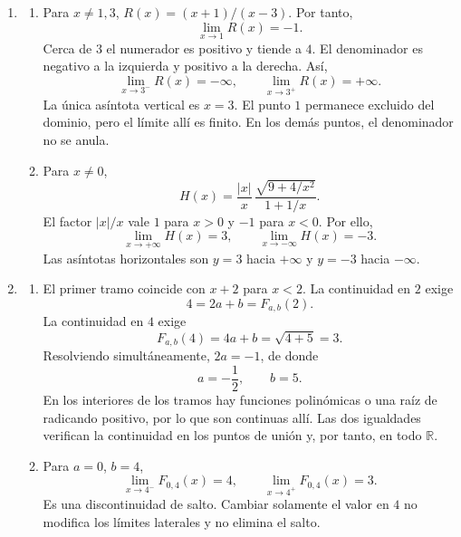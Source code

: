 \documentclass[10pt,a5paper]{article}
\newif\ifmostrarSoluciones
\begin{document}
\ifmostrarSoluciones
\newpage
\begin{solucion}[de la versión 1]
\begin{enumerate}
  \item
  \begin{enumerate}
    \item Para $x\neq1,3$, $R(x)=(x+1)/(x-3)$. Por tanto,
    \[
      \lim_{x\to1}R(x)=-1.
    \]
    Cerca de $3$ el numerador es positivo y tiende a $4$. El denominador es negativo a la izquierda y positivo a la derecha. Así,
    \[
      \lim_{x\to3^-}R(x)=-\infty,\qquad
      \lim_{x\to3^+}R(x)=+\infty.
    \]
    La única asíntota vertical es $x=3$. El punto $1$ permanece excluido del dominio, pero el límite allí es finito. En los demás puntos, el denominador no se anula.
    \item Para $x\neq0$,
    \[
      H(x)=\frac{|x|}{x}\,
      \frac{\sqrt{9+4/x^2}}{1+1/x}.
    \]
    El factor $|x|/x$ vale $1$ para $x>0$ y $-1$ para $x<0$. Por ello,
    \[
      \lim_{x\to+\infty}H(x)=3,\qquad
      \lim_{x\to-\infty}H(x)=-3.
    \]
    Las asíntotas horizontales son $y=3$ hacia $+\infty$ y $y=-3$ hacia $-\infty$.
  \end{enumerate}

  \item
  \begin{enumerate}
    \item El primer tramo coincide con $x+2$ para $x<2$. La continuidad en $2$ exige
    \[
      4=2a+b=F_{a,b}(2).
    \]
    La continuidad en $4$ exige
    \[
      F_{a,b}(4)=4a+b=\sqrt{4+5}=3.
    \]
    Resolviendo simultáneamente, $2a=-1$, de donde
    \[
      a=-\frac12,\qquad b=5.
    \]
    En los interiores de los tramos hay funciones polinómicas o una raíz de radicando positivo, por lo que son continuas allí. Las dos igualdades verifican la continuidad en los puntos de unión y, por tanto, en todo $\mathbb{R}$.
    \item Para $a=0$, $b=4$,
    \[
      \lim_{x\to4^-}F_{0,4}(x)=4,\qquad
      \lim_{x\to4^+}F_{0,4}(x)=3.
    \]
    Es una discontinuidad de salto. Cambiar solamente el valor en $4$ no modifica los límites laterales y no elimina el salto.
  \end{enumerate}


\end{enumerate}
\end{solucion}
\end{document}
